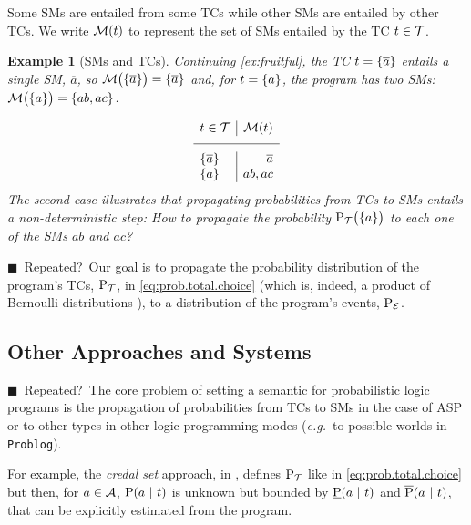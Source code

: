 \documentclass{tlp}
\renewcommand{\cite}{\citep}
\newtheorem{example}{Example}
\newcommand{\eat}[1]{}
\newcommand{\at}[1]{\ensuremath{\!\del{#1}}}        %
\newcommand{\cla}[1]{\ensuremath{{\cal #1}}}        %
\newcommand{\co}[1]{\ensuremath{\overline{#1}}}     %
\newcommand{\ATOMSset}{\ensuremath{\cla{A}}}
\newcommand{\TCHOICEset}{\ensuremath{\cla{T}}}
\newcommand{\MODELset}{\ensuremath{\cla{M}}}
\newcommand{\EVENTSset}{\ensuremath{\cla{E}}}
\newcommand{\prfunc}{\ensuremath{\mathrm{P}}}
\newcommand{\pr}[1]{\ensuremath{\prfunc\at{#1}}}
\newcommand{\prd}[1]{\ensuremath{\prfunc_{#1}}}
\newcommand{\prT}{\prd{\TCHOICEset}}
\newcommand{\prE}{\prd{\EVENTSset}}
\newcommand{\given}{\ensuremath{~\middle|~}}
\newcommand{\tcgen}[1]{\MODELset\at{#1}}
\newcommand{\LOOK}{\ensuremath{\blacksquare}}
\newcommand{\franc}[1]{{\color{green!30!black}#1}}
\newcommand{\bruno}{\color{red!60!black}}
\begin{document}
Some \aclp{SM} are entailed from some \aclp{TC} while other \acp{SM}
are entailed by other \acp{TC}.  We write \(\tcgen{t}\) to represent
the set of \aclp{SM} entailed by the \acl{TC} \(t \in \TCHOICEset\).

\begin{example}[\Aclp{SM} and \aclp{TC}]%
  \em Continuing \cref{ex:fruitful}, the \acl{TC} \(t = \set{\co{a}}\)
  entails a single \acl{SM}, \(\co{a}\), so
  \( \MODELset\at{\set{\co{a}}} = \set{\co{a}} \) and, for
  \(t = \set{a}\), the program has two \aclp{SM}:
  \( \MODELset\at{\set{a}} = \set{ab, ac}\).

  \begin{equation*}
    \begin{array}{l|r}
      t \in \TCHOICEset   & \MODELset\at{t} \\
      \hline \set{\co{a}} & \co{a}          \\
      \set{a}             & ab, ac
    \end{array}
  \end{equation*}
  The second case illustrates that propagating probabilities from
  \aclp{TC} to \aclp{SM} entails a non-deterministic step: \textit{How
    to propagate the probability \(\prT\at{\set{a}}\) to each one of
    the \aclp{SM} \(ab\) and \(ac\)?}
\end{example}

%
\franc{\LOOK~Repeated?~}Our goal is to propagate the probability
distribution of the program's \aclp{TC}, \(\prT\), in
\cref{eq:prob.total.choice} (which is, indeed, a product of Bernoulli
distributions \cite{Teugels90}), to a distribution of the program's
events, \(\prE\).


\subsection*{Other Approaches and Systems}

\eat{\bruno This subsection seems out of place here! \franc{~Fixed?}}

\franc{\LOOK~Repeated?~}The core problem of setting a semantic for
probabilistic logic programs is the propagation of probabilities from
\aclp{TC} to \aclp{SM} in the case of \ac{ASP} or to other types in
other logic programming modes (\emph{e.g.}\ to possible worlds in
\texttt{Problog}).

For example, the \emph{credal set} approach, in \cite{cozman2020joy},
defines \(\prT\) like in \cref{eq:prob.total.choice} but then, for
\(a \in \ATOMSset\), \(\pr{a \given t}\) is unknown but bounded by
\(\underbar{\prfunc}\at{a \given t}\) and
\(\overline{\prfunc}\at{a \given t}\), that can be explicitly
estimated from the program.
\end{document}
